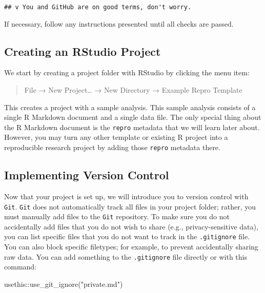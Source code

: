 \documentclass[psych,tutorial,submit,moreauthors,pdftex]{mdpi}
\newenvironment{Shaded}{\begin{snugshade}}{\end{snugshade}}
\newcommand{\FunctionTok}[1]{\textcolor[rgb]{0.00,0.00,0.00}{#1}}
\newcommand{\NormalTok}[1]{#1}
\newcommand{\SpecialCharTok}[1]{\textcolor[rgb]{0.00,0.00,0.00}{#1}}
\newcommand{\StringTok}[1]{\textcolor[rgb]{0.31,0.60,0.02}{#1}}
\begin{document}
\begin{verbatim}
## v You and GitHub are on good terms, don't worry.
\end{verbatim}

If necessary, follow any instructions presented until all checks are
passed.

\hypertarget{creating-an-rstudio-project}{%
\subsection{Creating an RStudio
Project}\label{creating-an-rstudio-project}}

We start by creating a project folder with RStudio by clicking the menu
item:

\begin{quote}
File → New Project\ldots{} → New Directory → Example Repro Template
\end{quote}

This creates a project with a sample analysis. This sample analysis
consists of a single R Markdown document and a single data file. The
only special thing about the R Markdown document is the \texttt{repro}
metadata that we will learn later about. However, you may turn any other
template or existing R project into a reproducible research project by
adding those \texttt{repro} metadata there.

\hypertarget{implementing-version-control}{%
\subsection{Implementing Version
Control}\label{implementing-version-control}}

Now that your project is set up, we will introduce you to version
control with \texttt{Git}. \texttt{Git} does not automatically track all
files in your project folder; rather, you must manually add files to the
\texttt{Git} repository. To make sure you do not accidentally add files
that you do not wish to share (e.g., privacy-sensitive data), you can
list specific files that you do not want to track in the
\texttt{.gitignore} file. You can also block specific filetypes; for
example, to prevent accidentally sharing raw data. You can add something
to the \texttt{.gitignore} file directly or with this command:

\begin{Shaded}
\begin{Highlighting}[]
\NormalTok{usethis}\SpecialCharTok{::}\FunctionTok{use\_git\_ignore}\NormalTok{(}\StringTok{"private.md"}\NormalTok{)}
\end{Highlighting}
\end{Shaded}
\end{document}
